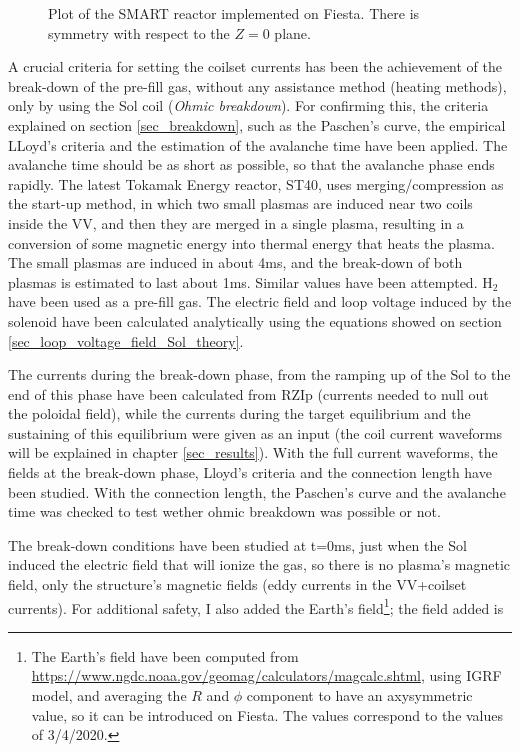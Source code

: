 \documentclass[a4paper,12pt,oneside]{book}
\begin{document}
\begin{figure}[htbp]
\centering
{}
\hfill
{}
\caption{Plot of the SMART reactor implemented on Fiesta. There is symmetry with respect to the $Z=0$ plane.}
\label{fig_SMART_3D_2D}
\end{figure}

A crucial criteria for setting the coilset currents has been the achievement of the break-down of the pre-fill gas, without any assistance method (heating methods), only by using the Sol coil (\textit{Ohmic breakdown}). For confirming this, the criteria explained on section \ref{sec_breakdown}, such as the Paschen's curve, the empirical LLoyd's criteria and the estimation of the avalanche time have been applied. The avalanche time should be as short as possible, so that the avalanche phase ends rapidly. The latest Tokamak Energy reactor, ST40, \cite{Buxton_results, Gryaznevich_2017} uses merging/compression as the start-up method, in which two small plasmas are induced near two coils inside the VV, and then they are merged in a single plasma, resulting in a conversion of some magnetic energy into thermal energy that heats the plasma. The small plasmas are induced in about 4ms, and the break-down of both plasmas is estimated to last about 1ms. Similar values have been attempted. H$_2$ have been used as a pre-fill gas. The electric field and loop voltage induced by the solenoid have been calculated analytically using the equations showed on section \ref{sec_loop_voltage_field_Sol_theory}.

The currents during the break-down phase, from the ramping up of the Sol to the end of this phase have been calculated from RZIp (currents needed to null out the poloidal field), while the currents during the target equilibrium and the sustaining of this equilibrium were given as an input (the coil current waveforms will be explained in chapter \ref{sec_results}). With the full current waveforms, the fields at the break-down phase, Lloyd's criteria and the connection length have been studied. With the connection length, the Paschen's curve and the avalanche time was checked to test wether ohmic breakdown was possible or not.

The break-down conditions have been studied at t=0ms, just when the Sol induced the electric field that will ionize the gas, so there is no plasma's magnetic field, only the structure's magnetic fields (eddy currents in the VV+coilset currents). For additional safety, I also added the Earth's field\footnote{The Earth's field have been computed from \url{https://www.ngdc.noaa.gov/geomag/calculators/magcalc.shtml}, using IGRF model, and averaging the $R$ and $\phi$ component to have an axysymmetric value, so it can be introduced on Fiesta. The values correspond to the values of 3/4/2020.}; the field added is
\end{document}

